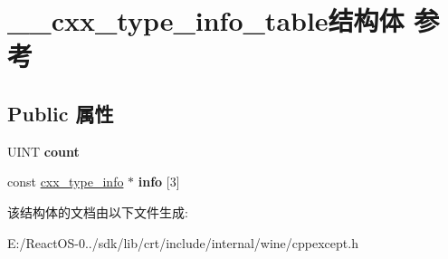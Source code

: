 \hypertarget{struct____cxx__type__info__table}{}\section{\+\_\+\+\_\+cxx\+\_\+type\+\_\+info\+\_\+table结构体 参考}
\label{struct____cxx__type__info__table}
\subsection*{Public 属性}
\begin{DoxyCompactItemize}
\item 
\mbox{\label{struct____cxx__type__info__table_a6958dc4a28ee5733acd18eb9c430aca1}} 
U\+I\+NT {\bfseries count}
\item 
\mbox{\label{struct____cxx__type__info__table_a4b504f129d9b6eec5e192ca328fff28d}} 
const \hyperlink{struct____cxx__type__info}{cxx\+\_\+type\+\_\+info} $\ast$ {\bfseries info} \mbox{[}3\mbox{]}
\end{DoxyCompactItemize}


该结构体的文档由以下文件生成\+:\begin{DoxyCompactItemize}
\item 
E\+:/\+React\+O\+S-\/0../sdk/lib/crt/include/internal/wine/cppexcept.\+h\end{DoxyCompactItemize}
